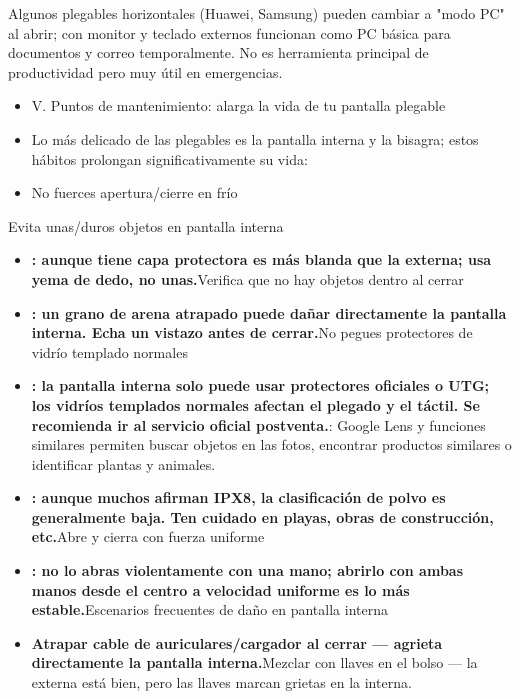 \begin{tcbwarn}{Algunos plegables horizontales (Huawei, Samsung) pueden cambiar a "modo PC" al abrir; con monitor y teclado externos funcionan como PC básica para documentos y correo temporalmente. No es herramienta principal de productividad pero muy útil en emergencias.}
\begin{itemize}
  \item V. Puntos de mantenimiento: alarga la vida de tu pantalla plegable
  \item Lo más delicado de las plegables es la pantalla interna y la bisagra; estos hábitos prolongan significativamente su vida:
  \item No fuerces apertura/cierre en frío
\end{itemize}

\end{tcbwarn}


Evita unas/duros objetos en pantalla interna

\begin{itemize}
  \item \textbf{: aunque tiene capa protectora es más blanda que la externa; usa yema de dedo, no unas.}Verifica que no hay objetos dentro al cerrar
  \item \textbf{: un grano de arena atrapado puede dañar directamente la pantalla interna. Echa un vistazo antes de cerrar.}No pegues protectores de vidrío templado normales
  \item \textbf{: la pantalla interna solo puede usar protectores oficiales o UTG; los vidríos templados normales afectan el plegado y el táctil. Se recomienda ir al servicio oficial postventa.}: Google Lens y funciones similares permiten buscar objetos en las fotos, encontrar productos similares o identificar plantas y animales.
  \item \textbf{: aunque muchos afirman IPX8, la clasificación de polvo es generalmente baja. Ten cuidado en playas, obras de construcción, etc.}Abre y cierra con fuerza uniforme
  \item \textbf{: no lo abras violentamente con una mano; abrirlo con ambas manos desde el centro a velocidad uniforme es lo más estable.}Escenarios frecuentes de daño en pantalla interna
  \item \textbf{Atrapar cable de auriculares/cargador al cerrar — agrieta directamente la pantalla interna.}Mezclar con llaves en el bolso — la externa está bien, pero las llaves marcan grietas en la interna.
\end{itemize}

